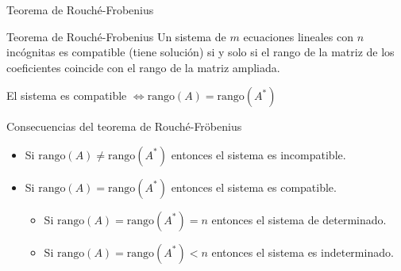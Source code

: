 \documentclass[9pt]{beamer}
\begin{document}
\begin{frame}{Teorema de Rouché-Frobenius}
\begin{alertblock}{Teorema de Rouché-Frobenius}
Un sistema de $m$ ecuaciones lineales con $n$ incógnitas es compatible (tiene solución) si y solo si el rango de la matriz de los coeficientes coincide con el rango de la matriz ampliada.

El sistema es compatible $\Leftrightarrow  \text{rango}(A)=\text{rango}(A^*)$

\end{alertblock}
\pause
\begin{alertblock}{Consecuencias del teorema de Rouché-Fröbenius}

\begin{itemize}[<+->]
\item Si $ \text{rango}(A) \neq \text{rango}(A^*)$ entonces el sistema es incompatible.
\item Si $ \text{rango}(A)=\text{rango}(A^*)$ entonces el sistema es compatible.
\begin{itemize}[<+->]
\item Si $\text{rango}(A)=\text{rango}(A^*)=n$ entonces el sistema de determinado.
\item Si $\text{rango}(A)=\text{rango}(A^*)<n$ entonces el sistema es indeterminado.

\end{itemize}
\end{itemize}

\end{alertblock}
\end{frame}
\end{document}
